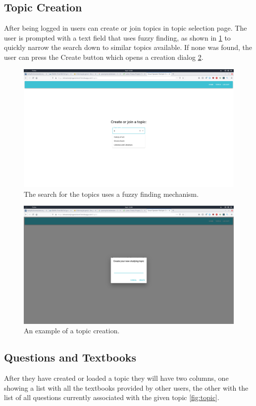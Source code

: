\subsection{Topic Creation}
After being logged in users can create 
or join topics in topic selection page. The user is prompted with a text field that 
uses fuzzy finding, as shown in \ref{fig:topic_search} to quickly narrow the search down to similar topics available.
If none was found, the user can press the Create button which opens a creation dialog \ref{fig:topic_creation}.

 \begin{figure}
  \centering
  \includegraphics[width=.9\linewidth]{images/app/asa/topic_selection2.png}
  \caption{The search for the topics uses a fuzzy finding mechanism.}
  \label{fig:topic_search}
 \end{figure}
 
 \begin{figure}
  \centering
  \includegraphics[width=.9\linewidth]{images/app/asa/topic_creation.png}
  \caption{An example of a topic creation.}
  \label{fig:topic_creation}
 \end{figure}

\subsection{Questions and Textbooks}
After they have created or loaded a topic they will have two columns, one showing a list with
all the textbooks provided by other users, the other with the list of all questions
currently associated with the given topic \ref{fig:topic}.

